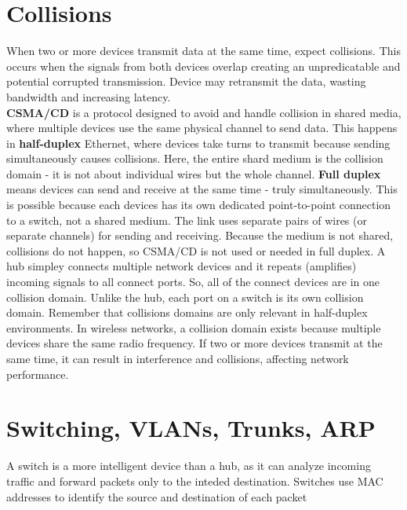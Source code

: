\documentclass{article}
\begin{document}
\section*{Collisions}
When two or more devices transmit data at the same time, expect collisions. This occurs when the signals from both devices overlap creating an unpredicatable and potential corrupted transmission. Device may retransmit the data, wasting bandwidth and increasing latency.\\ 

\textbf{CSMA/CD} is a protocol designed to avoid and handle collision in shared media, where multiple devices use the same physical channel to send data. This happens in \textbf{half-duplex} Ethernet, where devices take turns to transmit because sending simultaneously causes collisions. Here, the entire shard medium is the collision domain - it is not about individual wires but the whole channel. \textbf{Full duplex} means devices can send and receive at the same time - truly simultaneously. This is possible because each devices has its own dedicated point-to-point connection to a switch, not a shared medium. The link uses separate pairs of wires (or separate channels) for sending and receiving. Because the medium is not shared, collisions do not happen, so CSMA/CD is not used or needed in full duplex. A hub simpley connects multiple network devices and it repeats (amplifies) incoming signals to all connect ports. So, all of the connect devices are in one collision domain. Unlike the hub, each port on a switch is its own collision domain. Remember that collisions domains are only relevant in half-duplex environments. In wireless networks, a collision domain exists because multiple devices share the same radio frequency. If two or more devices transmit at the same time, it can result in interference and collisions, affecting network performance.\\

\section*{Switching, VLANs, Trunks, ARP}
A switch is a more intelligent device than a hub, as it can analyze incoming traffic and forward packets only to the inteded destination. Switches use MAC addresses to identify the source and destination of each packet\\
\end{document}
